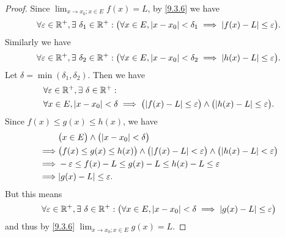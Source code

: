 \begin{proof}
  Since \(\lim_{x \to x_0 ; x \in E} f(x) = L\), by \cref{9.3.6} we have
  \[
    \forall \varepsilon \in \mathbb{R}^+, \exists\ \delta_1 \in \mathbb{R}^+ : \big(\forall x \in E, \left\lvert x - x_0\right\rvert < \delta_1 \implies \left\lvert f(x) - L\right\rvert \leq \varepsilon\big).
  \]
  Similarly we have
  \[
    \forall \varepsilon \in \mathbb{R}^+, \exists\ \delta_2 \in \mathbb{R}^+ : \big(\forall x \in E, \left\lvert x - x_0\right\rvert < \delta_2 \implies \left\lvert h(x) - L\right\rvert \leq \varepsilon\big).
  \]
  Let \(\delta = \min(\delta_1, \delta_2)\).
  Then we have
  \begin{align*}
     & \forall \varepsilon \in \R^+, \exists\ \delta \in \R^+ :                                                                                    \\
     & \forall x \in E, \abs{x - x_0} < \delta \implies \big(\abs{f(x) - L} \leq \varepsilon\big) \land \big(\abs{h(x) - L} \leq \varepsilon\big).
  \end{align*}
  Since \(f(x) \leq g(x) \leq h(x)\), we have
  \begin{align*}
             & \big(x \in E\big) \land \big(\abs{x - x_0} < \delta\big)                                                                     \\
    \implies & \big(f(x) \leq g(x) \leq h(x)\big) \land \big(\abs{f(x) - L} < \varepsilon\big) \land \big(\abs{h(x) - L} < \varepsilon\big) \\
    \implies & -\varepsilon \leq f(x) - L \leq g(x) - L \leq h(x) - L \leq \varepsilon                                                      \\
    \implies & \abs{g(x) - L} \leq \varepsilon.
  \end{align*}
  But this means
  \[
    \forall \varepsilon \in \mathbb{R}^+, \exists\ \delta \in \mathbb{R}^+ : \big(\forall x \in E, \left\lvert x - x_0\right\rvert < \delta \implies \left\lvert g(x) - L\right\rvert \leq \varepsilon\big)
  \]
  and thus by \cref{9.3.6} \(\lim_{x \to x_0 ; x \in E} g(x) = L\).
\end{proof}